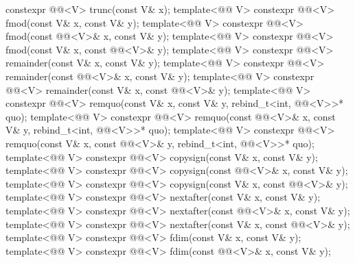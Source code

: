 \begin{codeblock}
{    constexpr @@<V> trunc(const V& x);
  template<@@ V>
    constexpr @@<V> fmod(const V& x, const V& y);
  template<@@ V>
    constexpr @@<V> fmod(const @@<V>& x, const V& y);
  template<@@ V>
    constexpr @@<V> fmod(const V& x, const @@<V>& y);
  template<@@ V>
    constexpr @@<V> remainder(const V& x, const V& y);
  template<@@ V>
    constexpr @@<V> remainder(const @@<V>& x, const V& y);
  template<@@ V>
    constexpr @@<V> remainder(const V& x, const @@<V>& y);
  template<@@ V>
    constexpr @@<V>
      remquo(const V& x, const V& y, rebind_t<int, @@<V>>* quo);
  template<@@ V>
    constexpr @@<V>
      remquo(const @@<V>& x, const V& y, rebind_t<int, @@<V>>* quo);
  template<@@ V>
    constexpr @@<V>
      remquo(const V& x, const @@<V>& y, rebind_t<int, @@<V>>* quo);
  template<@@ V>
    constexpr @@<V> copysign(const V& x, const V& y);
  template<@@ V>
    constexpr @@<V> copysign(const @@<V>& x, const V& y);
  template<@@ V>
    constexpr @@<V> copysign(const V& x, const @@<V>& y);
  template<@@ V>
    constexpr @@<V> nextafter(const V& x, const V& y);
  template<@@ V>
    constexpr @@<V> nextafter(const @@<V>& x, const V& y);
  template<@@ V>
    constexpr @@<V> nextafter(const V& x, const @@<V>& y);
  template<@@ V>
    constexpr @@<V> fdim(const V& x, const V& y);
  template<@@ V>
    constexpr @@<V> fdim(const @@<V>& x, const V& y);
}
\end{codeblock}

